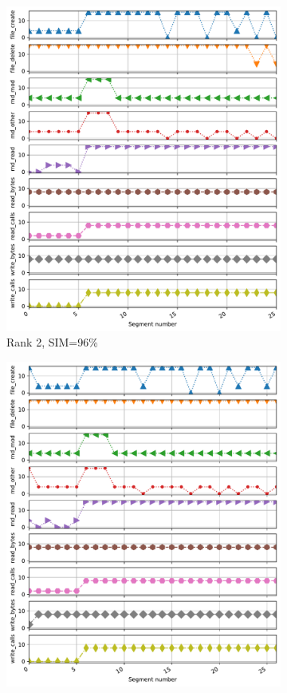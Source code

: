 \documentclass{jhps}
\begin{document}
\begin{figure}[bt]
\begin{subfigure}{0.3\textwidth}
\centering
\includegraphics[width=\textwidth]{job_similarities_4296426-out/hex_lev-0.9615--1timeseries4296288}
\caption{Rank 2, SIM=96\%}
\end{subfigure}
\begin{subfigure}{0.3\textwidth}
\centering
\includegraphics[width=\textwidth]{job_similarities_4296426-out/hex_lev-0.9012--15timeseries4296277}

\end{subfigure}
\end{figure}
\end{document}
